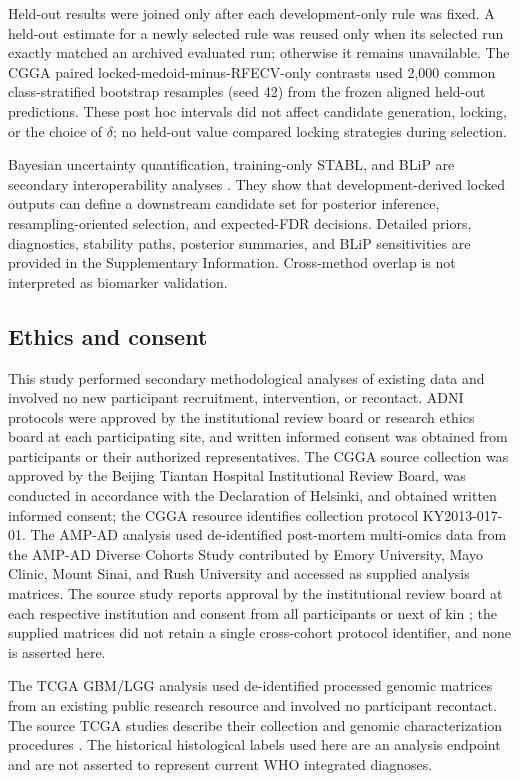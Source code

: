 Held-out results were joined only after each development-only rule was fixed. A held-out estimate for a newly selected rule was reused only when its selected run exactly matched an archived evaluated run; otherwise it remains unavailable. The CGGA paired locked-medoid-minus-RFECV-only contrasts used 2,000 common class-stratified bootstrap resamples (seed 42) from the frozen aligned held-out predictions. These post hoc intervals did not affect candidate generation, locking, or the choice of \(\delta\); no held-out value compared locking strategies during selection.

Bayesian uncertainty quantification, training-only STABL, and BLiP are secondary interoperability analyses \citep{ref25,ref30,ref32,ref33,ref34}. They show that development-derived locked outputs can define a downstream candidate set for posterior inference, resampling-oriented selection, and expected-FDR decisions. Detailed priors, diagnostics, stability paths, posterior summaries, and BLiP sensitivities are provided in the Supplementary Information. Cross-method overlap is not interpreted as biomarker validation.

\subsection{Ethics and consent}

This study performed secondary methodological analyses of existing data and involved no new participant recruitment, intervention, or recontact. ADNI protocols were approved by the institutional review board or research ethics board at each participating site, and written informed consent was obtained from participants or their authorized representatives. The CGGA source collection was approved by the Beijing Tiantan Hospital Institutional Review Board, was conducted in accordance with the Declaration of Helsinki, and obtained written informed consent; the CGGA resource identifies collection protocol KY2013-017-01. The AMP-AD analysis used de-identified post-mortem multi-omics data from the AMP-AD Diverse Cohorts Study contributed by Emory University, Mayo Clinic, Mount Sinai, and Rush University and accessed as supplied analysis matrices. The source study reports approval by the institutional review board at each respective institution and consent from all participants or next of kin \citep{ref37}; the supplied matrices did not retain a single cross-cohort protocol identifier, and none is asserted here.

The TCGA GBM/LGG analysis used de-identified processed genomic matrices from an existing public research resource and involved no participant recontact. The source TCGA studies describe their collection and genomic characterization procedures \citep{ref44,ref45}. The historical histological labels used here are an analysis endpoint and are not asserted to represent current WHO integrated diagnoses.

